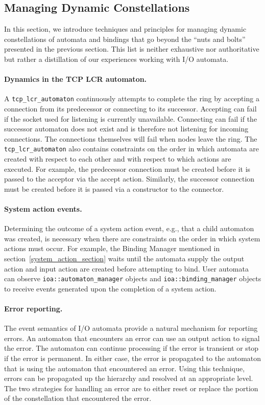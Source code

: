 \subsection{Managing Dynamic Constellations}

In this section, we introduce techniques and principles for managing dynamic constellations of automata and bindings that go beyond the ``nuts and bolts'' presented in the previous section.
This list is neither exhaustive nor authoritative but rather a distillation of our experiences working with I/O automata.

\paragraph{Dynamics in the TCP LCR automaton.}
A \verb+tcp_lcr_automaton+ continuously attempts to complete the ring by accepting a connection from its predecessor or connecting to its successor.
Accepting can fail if the socket used for listening is currently unavailable.
Connecting can fail if the successor automaton does not exist and is therefore not listening for incoming connections.
The connections themselves will fail when nodes leave the ring.
The \verb+tcp_lcr_automaton+ also contains constraints on the order in which automata are created with respect to each other and with respect to which actions are executed.
For example, the predecessor connection must be created before it is passed to the acceptor via the accept action.
Similarly, the successor connection must be created before it is passed via a constructor to the connector.

\paragraph{System action events.}
Determining the outcome of a system action event, e.g., that a child automaton was created, is necessary when there are constraints on the order in which system actions must occur.
For example, the Binding Manager mentioned in section~\ref{system_action_section} waits until the automata supply the output action and input action are created before attempting to bind.
User automata can observe \verb+ioa::automaton_manager+ objects and \verb+ioa::binding_manager+ objects to receive events generated upon the completion of a system action.

\paragraph{Error reporting.}
The event semantics of I/O automata provide a natural mechanism for reporting errors.
An automaton that encounters an error can use an output action to signal the error.
The automaton can continue processing if the error is transient or stop if the error is permanent.
In either case, the error is propagated to the automaton that is using the automaton that encountered an error.
Using this technique, errors can be propagated up the hierarchy and resolved at an appropriate level.
The two strategies for handling an error are to either reset or replace the portion of the constellation that encountered the error.

